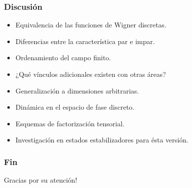 \documentclass[10pt, spanish]{beamer}
\begin{document}
  \begin{frame}
    \frametitle{Discusión}

    \begin{itemize}
      \item Equivalencia de las funciones de Wigner
        discretas.
      \pause
      \item Diferencias entre la característica par e impar.
      \pause
      \item Ordenamiento del campo finito.
      \pause
      \item ¿Qué vínculos adicionales existen con otras
        áreas?
      \pause
      \item Generalización a dimensiones arbitrarias.
      \pause
      \item Dinámica en el espacio de fase discreto.
      \pause
      \item Esquemas de factorización tensorial.
      \pause
      \item Investigación en estados estabilizadores para
        ésta versión.
    \end{itemize}
  \end{frame}

  \begin{frame}
    \frametitle{Fin}

    Gracias por su atención!
  \end{frame}





\end{document}
